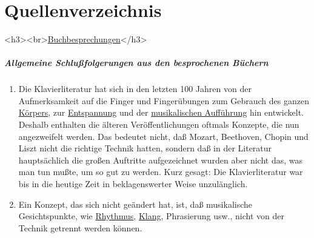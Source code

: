 
\chapter{Quellenverzeichnis}
\label{reference}

<h3><br>\underline{Buchbesprechungen}</h3>

\paragraph{Allgemeine Schlußfolgerungen aus den besprochenen Büchern}
\label{allgemein}

\begin{enumerate}[label={\arabic*.}] 
\item 
Die Klavierliteratur hat sich in den letzten 100 Jahren von der Aufmerksamkeit auf die Finger und Fingerübungen zum Gebrauch des ganzen \hyperref[c1iii4c]{Körpers}, zur \hyperref[c1ii14]{Entspannung} und der \hyperref[c1iii14d]{musikalischen Aufführung} hin entwickelt.
Deshalb enthalten die älteren Veröffentlichungen oftmals Konzepte, die nun angezweifelt werden.
Das bedeutet nicht, daß Mozart, Beethoven, Chopin und Liszt nicht die richtige Technik hatten, sondern daß in der Literatur hauptsächlich die großen Auftritte aufgezeichnet wurden aber nicht das, was man tun mußte, um so gut zu werden.
Kurz gesagt: Die Klavierliteratur war bis in die heutige Zeit in beklagenswerter Weise unzulänglich.

\item Ein Konzept, das sich nicht geändert hat, ist, daß musikalische Gesichtspunkte, wie \hyperref[c1iii1b]{Rhythmus}, \hyperref[c1iii1]{Klang}, Phrasierung usw., nicht von der Technik getrennt werden können.


\end{enumerate}
